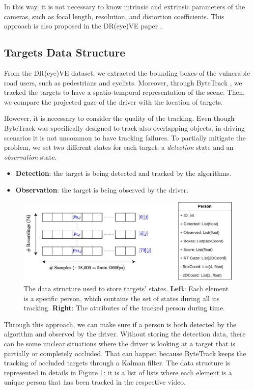 In this way, it is not necessary to know intrinsic and extrinsic parameters of 
the cameras, such as focal length, resolution, and distortion coefficients. 
This approach is also proposed in the DR(eye)VE paper \cite{dreyeve}.


\subsection{Targets Data Structure}
From the DR(eye)VE dataset, we extracted the bounding boxes of the vulnerable 
road users, such as pedestrians and cyclists.
Moreover, through ByteTrack \cite{bytetrack}, we tracked the targets to have a 
spatio-temporal representation of the scene. Then, we compare the projected gaze 
of the driver with the location of targets. 

However, it is necessary to consider the quality of the tracking. Even though 
ByteTrack was specifically designed to track also overlapping objects, in driving 
scenarios it is not uncommon to have tracking failures. To partially mitigate 
the problem, we set two different states for each target: a 
\emph{detection} state and an \emph{observation} state.
\begin{itemize}
    \addtolength\itemsep{-2mm}
    \item \textbf{Detection}: the target is being detected and tracked by the algorithms.
    \item \textbf{Observation}: the target is being observed by the driver.
\end{itemize}

\begin{figure}
\centering
\includegraphics[width=\textwidth]{images/dreyeve/people_data_structure.pdf}
\caption[Data structure to store targets' states]
{The data structure used to store targets' states.
\textbf{Left}: Each element is a specific person, which contains the set of 
states during all its tracking.
\textbf{Right}: The attributes of the tracked person during time.
}
\label{fig:targets_data_structure}
\end{figure}
Through this approach, we can make sure if a person is both detected by the 
algorithm and observed by the driver. Without storing the detection data, there 
can be some unclear situations where the driver is looking at a target that is 
partially or completely occluded. That can happen because ByteTrack keeps the 
tracking of occluded targets through a Kalman filter. 
The data structure is represented in details 
in Figure \ref{fig:targets_data_structure}: it is a list of lists where each 
element is a unique person that has been tracked in the respective video.

